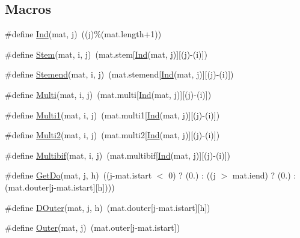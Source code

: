 \subsection*{Macros}
\begin{DoxyCompactItemize}
\item 
\#define \hyperlink{matrix_8hh_a86bb2cd84b8b46bd7709f3e2706128a7}{Ind}(mat, j)~((j)\%(mat.\+length+1))
\item 
\#define \hyperlink{matrix_8hh_a884bd30af2c24cbc6d050f96032b8908}{Stem}(mat, i, j)~(mat.\+stem\mbox{[}\hyperlink{matrix_8hh_a86bb2cd84b8b46bd7709f3e2706128a7}{Ind}(mat, j)\mbox{]}\mbox{[}(j)-\/(i)\mbox{]})
\item 
\#define \hyperlink{matrix_8hh_a05f323860c8ddad3c2f2cbe42ad26a24}{Stemend}(mat, i, j)~(mat.\+stemend\mbox{[}\hyperlink{matrix_8hh_a86bb2cd84b8b46bd7709f3e2706128a7}{Ind}(mat, j)\mbox{]}\mbox{[}(j)-\/(i)\mbox{]})
\item 
\#define \hyperlink{matrix_8hh_a2597f0c588e5b1afbb1d9757f3211132}{Multi}(mat, i, j)~(mat.\+multi\mbox{[}\hyperlink{matrix_8hh_a86bb2cd84b8b46bd7709f3e2706128a7}{Ind}(mat, j)\mbox{]}\mbox{[}(j)-\/(i)\mbox{]})
\item 
\#define \hyperlink{matrix_8hh_a8d73a18ba89901d60dbe77de01cc39c6}{Multi1}(mat, i, j)~(mat.\+multi1\mbox{[}\hyperlink{matrix_8hh_a86bb2cd84b8b46bd7709f3e2706128a7}{Ind}(mat, j)\mbox{]}\mbox{[}(j)-\/(i)\mbox{]})
\item 
\#define \hyperlink{matrix_8hh_a65dbd4eff057e962930243bf7ae5e120}{Multi2}(mat, i, j)~(mat.\+multi2\mbox{[}\hyperlink{matrix_8hh_a86bb2cd84b8b46bd7709f3e2706128a7}{Ind}(mat, j)\mbox{]}\mbox{[}(j)-\/(i)\mbox{]})
\item 
\#define \hyperlink{matrix_8hh_a452a5901adf33b09f675c2e3f31e3ba4}{Multibif}(mat, i, j)~(mat.\+multibif\mbox{[}\hyperlink{matrix_8hh_a86bb2cd84b8b46bd7709f3e2706128a7}{Ind}(mat, j)\mbox{]}\mbox{[}(j)-\/(i)\mbox{]})
\item 
\#define \hyperlink{matrix_8hh_a8421428b8784209efa9f6ff99468e7b3}{Get\+Do}(mat, j, h)~((j-\/mat.\+istart $<$ 0) ? (0.) \+: ((j $>$ mat.\+iend) ? (0.) \+: (mat.\+douter\mbox{[}j-\/mat.\+istart\mbox{]}\mbox{[}h\mbox{]})))
\item 
\#define \hyperlink{matrix_8hh_ac3f0a682371b9df49cf9b58304cad8ef}{D\+Outer}(mat, j, h)~(mat.\+douter\mbox{[}j-\/mat.\+istart\mbox{]}\mbox{[}h\mbox{]})
\item 
\#define \hyperlink{matrix_8hh_a85e39e12ef8133feb2fcb998f82fae31}{Outer}(mat, j)~(mat.\+outer\mbox{[}j-\/mat.\+istart\mbox{]})
\end{DoxyCompactItemize}
